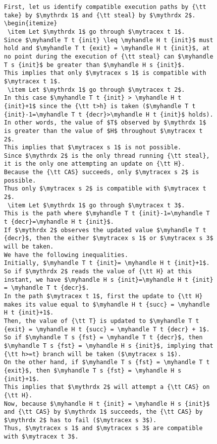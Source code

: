 \documentclass[a4paper]{article}
\begin{document}
{\begin{figure}
\begin{lstlisting}
First, let us identify compatible execution paths by {\tt take} by $\mythrdx 1$ and {\tt steal} by $\mythrdx 2$. 
\begin{itemize}
 \item Let $\mythrdx 1$ go through $\mytracex t 1$.
Since $\myhandle T t {init} \leq \myhandle H t {init}$ must hold and $\myhandle T t {exit} = \myhandle H t {init}$, at no point during the execution of {\tt steal} can $\myhandle T s {init}$ be greater than $\myhandle H s {init}$.
This implies that only $\mytracex s 1$ is compatible with $\mytracex t 1$.
 \item Let $\mythrdx 1$ go through $\mytracex t 2$.
In this case $\myhandle T t {init} > \myhandle H t {init}+1$ since the {\tt t>h} is taken ($\myhandle T t {init}-1=\myhandle T t {decr}>\myhandle H t {init}$ holds).
In other words, the value of $T$ observed by $\mythrdx 1$ is greater than the value of $H$ throughout $\mytracex t 2$.
This implies that $\mytracex s 1$ is not possible.
Since $\mythrdx 2$ is the only thread running {\tt steal}, it is the only one attempting an update on {\tt H}.
Because the {\tt CAS} succeeds, only $\mytracex s 2$ is possible.
Thus only $\mytracex s 2$ is compatible with $\mytracex t 2$.
 \item Let $\mythrdx 1$ go through $\mytracex t 3$.
This is the path where $\myhandle T t {init}-1=\myhandle T t {decr}=\myhandle H t {init}$.
If $\mythrdx 2$ observes the updated value $\myhandle T t {decr}$, then the either $\mytracex s 1$ or $\mytracex s 3$ will be taken.
We have the following inequalities.
Initially, $\myhandle T t {init}= \myhandle H t {init}+1$. 
So if $\mythrdx 2$ reads the value of {\tt H} at this instant, we have $\myhandle H s {init}=\myhandle H t {init} = \myhandle T t {decr}$.
In the path $\mytracex t 1$, first the update to {\tt H} makes its value equal to $\myhandle H t {succ} = \myhandle H t {init}+1$.
Then, the value of {\tt T} is updated to $\myhandle T t {exit} = \myhandle H t {succ} = \myhandle T t {decr} + 1$.
So if $\myhandle T s {fst} = \myhandle T t {decr}$, then $\myhandle T s {fst} = \myhandle H s {init}$, implying that {\tt h>=t} branch will be taken ($\mytracex s 1$).
On the other hand, if $\myhandle T s {fst} = \myhandle T t {exit}$, then $\myhandle T s {fst} = \myhandle H s {init}+1$.
This implies that $\mythrdx 2$ will attempt a {\tt CAS} on {\tt H}.
Now, because $\myhandle H t {init} = \myhandle H s {init}$ and {\tt CAS} by $\mythrdx 1$ succeeds, the {\tt CAS} by $\mythrdx 2$ has to fail ($\mytracex s 3$).
Thus, $\mytracex s 1$ and $\mytracex s 3$ are compatible with $\mytracex t 3$.


\end{lstlisting}
\end{figure}}
\end{document}
